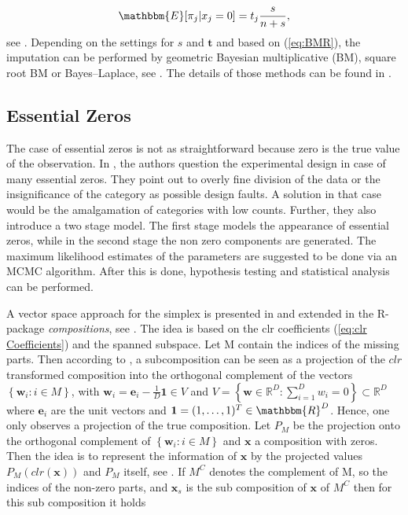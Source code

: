\begin{equation}
\mathbbm{E}[\pi_j|x_j=0]=t_j \frac{s}{n+s},
\label{eq:BMR}
\end{equation}
%
see \textcite{Palarea-Albaladejo:2015}. Depending on the settings for $s$ and $\bm{t}$ and based on (\ref{eq:BMR}), the imputation can be performed by geometric Bayesian multiplicative (BM), square root BM or Bayes–Laplace, see \textcite{Palarea-Albaladejo:2015}. The details of those methods can be found in \textcite{Fernandez:2015}. 


\subsection{Essential Zeros}
\label{sec: Essential Zeros}

The case of essential zeros is not as straightforward because zero is the true value of the observation. In \textcite{Aitchison:2003}, the authors question the experimental design in case of many essential zeros. They point out to overly fine division of the data or the insignificance of the category as possible design faults. A solution in that case would be the amalgamation of categories with low counts. Further, they also introduce a two stage model. The first stage models the appearance of essential zeros, while in the second stage the non zero components are generated. The maximum likelihood estimates of the parameters are suggested to be done via an MCMC algorithm. After this is done, hypothesis testing and statistical analysis can be performed. 

A vector space approach for the simplex is presented in \textcite{Boogaart:2006} and extended in the R-package \textit{compositions}, see \textcite{Compositions:2023}. The idea is based on the clr coefficients (\ref{eq:clr Coefficients}) and the spanned subspace. Let M contain the indices of the missing parts. Then according to \textcite{Egozcue:2005}, a subcomposition can be seen as a projection of the $clr$ transformed composition into the orthogonal complement of the vectors $\left\{\bm{w}_i: i \in M\right\}$, with $\bm{w}_i = \bm{e}_i - \frac{1}{D}\bm{1} \in V$ and $V = \left\{\textbf{w} \in \mathbb{R}^D: \sum_{i=1}^D w_i=0\right\} \subset \mathbb{R}^D$ where $\bm{e}_i$ are the unit vectors and $\bm{1}=(1,\ldots,1)^T \in \mathbbm{R}^D$. Hence, one only observes a projection of the true composition. Let $P_M$ be the projection onto the orthogonal complement of $\left\{\bm{w}_i: i \in M\right\}$ and $\bm{x}$ a composition with zeros. Then the idea is to represent the information of $\bm{x}$ by the projected values $P_M(clr(\bm{x}))$ and $P_M$ itself, see \textcite{Boogaart:2006}. If $M^C$ denotes the complement of M, so the indices of the non-zero parts, and $\bm{x}_s$ is the sub composition of $\bm{x}$ of $M^C$ then for this sub composition it holds 


